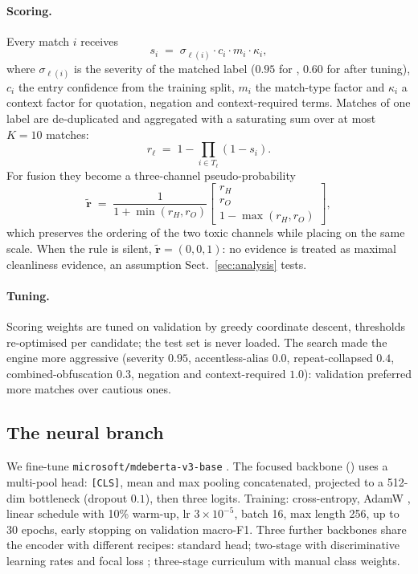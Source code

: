 \paragraph{Scoring.}
Every match $i$ receives
\begin{equation}
s_i \;=\; \sigma_{\ell(i)} \cdot c_i \cdot m_i \cdot \kappa_i ,
\label{eq:match}
\end{equation}
where $\sigma_{\ell(i)}$ is the severity of the matched label ($0.95$ for
\hate{}, $0.60$ for \off{} after tuning), $c_i$ the entry confidence from the
training split, $m_i$ the match-type factor and $\kappa_i$ a context factor for
quotation, negation and context-required terms. Matches of one label are
de-duplicated and aggregated with a saturating sum over at most $K=10$ matches:
\begin{equation}
r_\ell \;=\; 1-\prod_{i\in T_\ell}\left(1-s_i\right).
\label{eq:aggregate}
\end{equation}
For fusion they become a three-channel pseudo-probability
\begin{equation}
\tilde{\mathbf r} \;=\; \frac{1}{1+\min(r_H,r_O)}
\begin{bmatrix} r_H \\ r_O \\ 1-\max(r_H,r_O) \end{bmatrix},
\label{eq:pseudo}
\end{equation}
which preserves the ordering of the two toxic channels while placing \clean{} on
the same scale. When the rule is silent, $\tilde{\mathbf r}=(0,0,1)$: no evidence
is treated as maximal cleanliness evidence, an assumption
Sect.~\ref{sec:analysis} tests.

\paragraph{Tuning.}
Scoring weights are tuned on validation by greedy coordinate descent, thresholds
re-optimised per candidate; the test set is never loaded. The search made the engine more
aggressive (severity \hate{} $0.95$, accentless-alias $0.0$, repeat-collapsed $0.4$,
combined-obfuscation $0.3$, negation and context-required $1.0$): validation preferred
more matches over cautious ones.

\subsection{The neural branch}
\label{sec:neural}

We fine-tune \texttt{microsoft/mdeberta-v3-base}
\cite{he2023debertav3,liu2024mdeberta}. The focused backbone
() uses a multi-pool head: \texttt{[CLS]}, mean and max
pooling concatenated, projected to a 512-dim bottleneck (dropout $0.1$), then three
logits. Training: cross-entropy, AdamW \cite{loshchilov2019adamw}, linear schedule
with 10\% warm-up, lr $3\times10^{-5}$, batch 16, max length 256, up to 30 epochs,
early stopping on validation macro-F1. Three further backbones share the encoder with
different recipes: standard head; two-stage with discriminative learning rates and
focal loss \cite{lin2017focal}; three-stage curriculum \cite{bengio2009curriculum}
with manual class weights.

